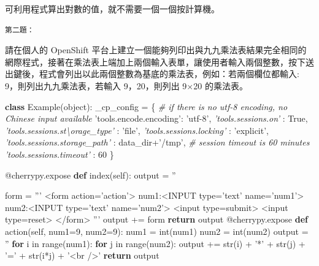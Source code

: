\documentclass[]{article}
\newenvironment{Shaded}{}{}
\newcommand{\KeywordTok}[1]{\textcolor[rgb]{0.00,0.44,0.13}{\textbf{{#1}}}}
\newcommand{\DataTypeTok}[1]{\textcolor[rgb]{0.56,0.13,0.00}{{#1}}}
\newcommand{\DecValTok}[1]{\textcolor[rgb]{0.25,0.63,0.44}{{#1}}}
\newcommand{\StringTok}[1]{\textcolor[rgb]{0.25,0.44,0.63}{{#1}}}
\newcommand{\CommentTok}[1]{\textcolor[rgb]{0.38,0.63,0.69}{\textit{{#1}}}}
\newcommand{\OtherTok}[1]{\textcolor[rgb]{0.00,0.44,0.13}{{#1}}}
\newcommand{\NormalTok}[1]{{#1}}
\begin{document}
可利用程式算出對數的值，就不需要一個一個按計算機。

\begin{verbatim}
第二題：
\end{verbatim}

請在個人的 OpenShift
平台上建立一個能夠列印出與九九乘法表結果完全相同的網際程式，接著在乘法表上端加上兩個輸入表單，讓使用者輸入兩個整數，按下送出鍵後，程式會列出以此兩個整數為基底的乘法表，例如：若兩個欄位都輸入:
9，則列出九九乘法表，若輸入 9，20，則列出 9×20 的乘法表。

\begin{Shaded}
\begin{Highlighting}[]
\KeywordTok{class} \NormalTok{Example(}\DataTypeTok{object}\NormalTok{):}
\NormalTok{_cp_config = \{}
\CommentTok{# if there is no utf-8 encoding, no Chinese input available}
\StringTok{'tools.encode.encoding'}\NormalTok{: }\StringTok{'utf-8'}\NormalTok{,}
\CommentTok{'tools.sessions.on'} \NormalTok{: }\OtherTok{True}\NormalTok{,}
\CommentTok{'tools.sessions.st\textbackslash{}orage_type'} \NormalTok{: }\StringTok{'file'}\NormalTok{,}
\CommentTok{'tools.sessions.locking'} \NormalTok{: }\StringTok{'explicit'}\NormalTok{,}
\CommentTok{'tools.sessions.storage_path'} \NormalTok{: data_dir+}\StringTok{'/tmp'}\NormalTok{,}
\CommentTok{# session timeout is 60 minutes}
\CommentTok{'tools.sessions.timeout'} \NormalTok{: }\DecValTok{60}
\NormalTok{\}}

\OtherTok{@cherrypy.expose}
\KeywordTok{def} \NormalTok{index(}\OtherTok{self}\NormalTok{):}
    \NormalTok{output = }\StringTok{''}

    \NormalTok{form = }\StringTok{'''}
\StringTok{    <form action='action'>}
\StringTok{    num1:<INPUT type='text' name='num1'>}
\StringTok{    num2:<INPUT type='text'  name='num2'>}
\StringTok{    <input type=submit>}
\StringTok{    <input type=reset>}
\StringTok{    </form>}
\StringTok{    '''}
    \NormalTok{output += form}
    \KeywordTok{return} \NormalTok{output}
\OtherTok{@cherrypy.expose}
\KeywordTok{def} \NormalTok{action(}\OtherTok{self}\NormalTok{, num1=}\DecValTok{9}\NormalTok{, num2=}\DecValTok{9}\NormalTok{):}
    \NormalTok{num1 = }\DataTypeTok{int}\NormalTok{(num1)}
    \NormalTok{num2 = }\DataTypeTok{int}\NormalTok{(num2)}
    \NormalTok{output = }\StringTok{''}
    \KeywordTok{for} \NormalTok{i in }\DataTypeTok{range}\NormalTok{(num1):}
        \KeywordTok{for} \NormalTok{j in }\DataTypeTok{range}\NormalTok{(num2):}
            \NormalTok{output += }\DataTypeTok{str}\NormalTok{(i) + }\StringTok{'*'} \NormalTok{+ }\DataTypeTok{str}\NormalTok{(j) + }\StringTok{'='} \NormalTok{+ }\DataTypeTok{str}\NormalTok{(i*j) + }\StringTok{'<br />'}
    \KeywordTok{return} \NormalTok{output}
\end{Highlighting}
\end{Shaded}
\end{document}
